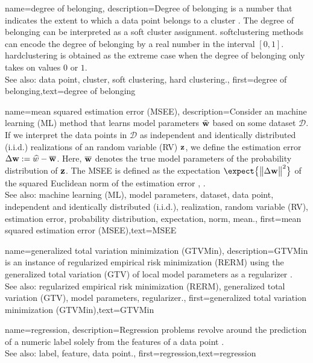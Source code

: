 {name={degree of belonging},
	description={Degree of belonging is a number that indicates the extent to which a data point 
		belongs to a cluster \cite[Ch. 8]{MLBasics}. The degree of belonging can be 
		interpreted as a soft cluster assignment. \Gls{softclustering} methods can 
		encode the degree of belonging by a real number in the interval $[0,1]$. 
		\Gls{hardclustering} is obtained as the extreme case when the degree of belonging 
		only takes on values $0$ or $1$.
					\\ 
		See also: data point, cluster, soft clustering, hard clustering.}, first={degree of belonging},text={degree of belonging} 
}

{name={mean squared estimation error (MSEE)},
	description={Consider an machine learning (ML) method that 
		learns model parameters $\widehat{{\bf w}}$ based on some dataset $\mathcal{D}$. 
		If we interpret the data points in $\mathcal{D}$ as independent and identically distributed (i.i.d.) realizations of an random variable (RV) ${\bf z}$, 
		we define the estimation error $\Delta {\bf w} := \widehat{w} - \overline{{\bf w}}$. 
		Here, $\overline{{\bf w}}$ denotes the true model parameters of the probability distribution 
		of ${\bf z}$. The MSEE is 
		defined as the expectation $\expect \big\{ \big\| \Delta {\bf w} \big\|^{2} \big\}$ of the 
		squared Euclidean norm of the estimation error \cite{LC}, \cite{kay}.
					\\ 
		See also: machine learning (ML), model parameters, dataset, data point, independent and identically distributed (i.i.d.), realization, random variable (RV), estimation error, probability distribution, expectation, norm, mean.},
	first={mean squared estimation error (MSEE)},text={MSEE} 
}

{name={generalized total variation minimization (GTVMin)},
	description={GTVMin is an instance of regularized empirical risk minimization (RERM) 
		using the generalized total variation (GTV) of local model parameters as a regularizer \cite{ClusteredFLTVMinTSP}.
					\\ 
		See also: regularized empirical risk minimization (RERM), generalized total variation (GTV), model parameters, regularizer.},
	first={generalized total variation minimization (GTVMin)},text={GTVMin} 
}

{name={regression},
	description={Regression problems revolve around the 
		prediction of a numeric label solely from the features of a data point \cite[Ch. 2]{MLBasics}.
					\\ 
		See also: label, feature, data point.},
	first={regression},text={regression} 
}

